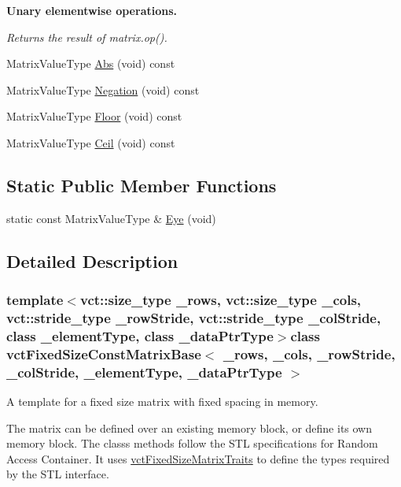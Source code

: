 \begin{Indent}{\bf Unary elementwise operations.}\par
{\em Returns the result of matrix.\+op(). }\begin{DoxyCompactItemize}
\item 
Matrix\+Value\+Type \hyperlink{classvct_fixed_size_const_matrix_base_adece2c517893f4390b4bdc01a373e694}{Abs} (void) const 
\item 
Matrix\+Value\+Type \hyperlink{classvct_fixed_size_const_matrix_base_a846a69adb8721a9ea7028592d445f97d}{Negation} (void) const 
\item 
Matrix\+Value\+Type \hyperlink{classvct_fixed_size_const_matrix_base_ad96f8a4475440a2dded7794deb1a7b0c}{Floor} (void) const 
\item 
Matrix\+Value\+Type \hyperlink{classvct_fixed_size_const_matrix_base_adf0ee227f5b408f08ab81c4ffd286d7b}{Ceil} (void) const 
\end{DoxyCompactItemize}
\end{Indent}
\subsection*{Static Public Member Functions}
\begin{DoxyCompactItemize}
\item 
static const Matrix\+Value\+Type \& \hyperlink{classvct_fixed_size_const_matrix_base_afc832f0fce11803913295c4059e407ef}{Eye} (void)
\end{DoxyCompactItemize}


\subsection{Detailed Description}
\subsubsection*{template$<$vct\+::size\+\_\+type \+\_\+rows, vct\+::size\+\_\+type \+\_\+cols, vct\+::stride\+\_\+type \+\_\+row\+Stride, vct\+::stride\+\_\+type \+\_\+col\+Stride, class \+\_\+element\+Type, class \+\_\+data\+Ptr\+Type$>$class vct\+Fixed\+Size\+Const\+Matrix\+Base$<$ \+\_\+rows, \+\_\+cols, \+\_\+row\+Stride, \+\_\+col\+Stride, \+\_\+element\+Type, \+\_\+data\+Ptr\+Type $>$}

A template for a fixed size matrix with fixed spacing in memory. 

The matrix can be defined over an existing memory block, or define its own memory block. The class\textquotesingle{}s methods follow the S\+T\+L specifications for Random Access Container. It uses \hyperlink{classvct_fixed_size_matrix_traits}{vct\+Fixed\+Size\+Matrix\+Traits} to define the types required by the S\+T\+L interface.

